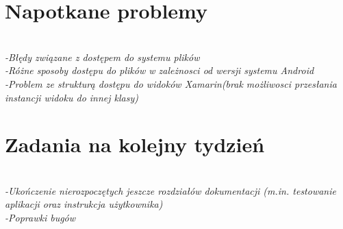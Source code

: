 \documentclass[12pt,a4paper]{mwart}
\begin{document}
\section{Napotkane problemy}
\textit{\\
-Błędy związane z dostępem do systemu plików\\
-Różne sposoby dostępu do plików w zależnosci od wersji systemu Android\\
-Problem ze strukturą dostępu do widoków Xamarin(brak możliwosci przesłania instancji widoku do innej klasy)
} %

\section{Zadania na kolejny tydzień}
\textit{\\
-Ukończenie nierozpoczętych jeszcze rozdziałów dokumentacji (m.in. testowanie aplikacji oraz instrukcja użytkownika)\\
-Poprawki bugów
} %
\end{document}
